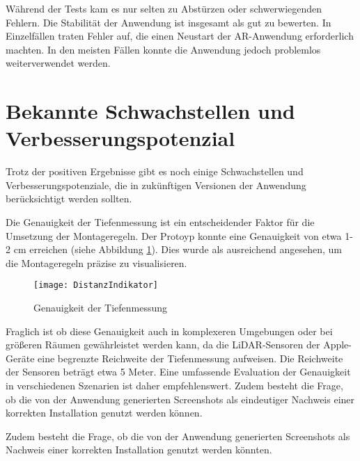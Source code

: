 Während der Tests kam es nur selten zu Abstürzen oder schwerwiegenden Fehlern. Die Stabilität der Anwendung ist insgesamt als gut zu bewerten. In Einzelfällen traten Fehler auf, die einen Neustart der AR-Anwendung erforderlich machten. In den meisten Fällen konnte die Anwendung jedoch problemlos weiterverwendet werden.

\section{Bekannte Schwachstellen und Verbesserungspotenzial}

Trotz der positiven Ergebnisse gibt es noch einige Schwachstellen und Verbesserungspotenziale, die in zukünftigen Versionen der Anwendung berücksichtigt werden sollten.

Die Genauigkeit der Tiefenmessung ist ein entscheidender Faktor für die Umsetzung der Montageregeln. Der Protoyp konnte eine Genauigkeit von etwa 1-2 cm erreichen (siehe Abbildung \ref{fig:DistanceIndicator}). Dies wurde als ausreichend angesehen, um die Montageregeln präzise zu visualisieren. 

\begin{figure}[ht]
    \centering
    \texttt{[image: DistanzIndikator]}
    \caption{Genauigkeit der Tiefenmessung}
    \label{fig:DistanceIndicator}
\end{figure}

Fraglich ist ob diese Genauigkeit auch in komplexeren Umgebungen oder bei größeren Räumen gewährleistet werden kann, da die LiDAR-Sensoren der Apple-Geräte eine begrenzte Reichweite der Tiefenmessung aufweisen. Die Reichweite der Sensoren beträgt etwa 5 Meter. Eine umfassende Evaluation der Genauigkeit in verschiedenen Szenarien ist daher empfehlenswert. Zudem besteht die Frage, ob die von der Anwendung generierten Screenshots als eindeutiger Nachweis einer korrekten Installation genutzt werden können. \cite{appledevdoc}

Zudem besteht die Frage, ob die von der Anwendung generierten Screenshots als Nachweis einer korrekten Installation genutzt werden könnten. 